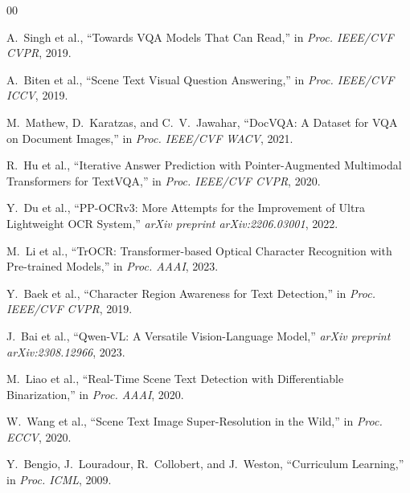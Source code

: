 \documentclass[conference]{IEEEtran}
\begin{document}
\begin{thebibliography}{00}

A.~Singh et al., ``Towards VQA Models That Can Read,'' in \emph{Proc. IEEE/CVF CVPR}, 2019.

A.~Biten et al., ``Scene Text Visual Question Answering,'' in \emph{Proc. IEEE/CVF ICCV}, 2019.

M.~Mathew, D.~Karatzas, and C.~V.~Jawahar, ``DocVQA: A Dataset for VQA on Document Images,'' in \emph{Proc. IEEE/CVF WACV}, 2021.

R.~Hu et al., ``Iterative Answer Prediction with Pointer-Augmented Multimodal Transformers for TextVQA,'' in \emph{Proc. IEEE/CVF CVPR}, 2020.

Y.~Du et al., ``PP-OCRv3: More Attempts for the Improvement of Ultra Lightweight OCR System,'' \emph{arXiv preprint arXiv:2206.03001}, 2022.

M.~Li et al., ``TrOCR: Transformer-based Optical Character Recognition with Pre-trained Models,'' in \emph{Proc. AAAI}, 2023.

Y.~Baek et al., ``Character Region Awareness for Text Detection,'' in \emph{Proc. IEEE/CVF CVPR}, 2019.

J.~Bai et al., ``Qwen-VL: A Versatile Vision-Language Model,'' \emph{arXiv preprint arXiv:2308.12966}, 2023.

M.~Liao et al., ``Real-Time Scene Text Detection with Differentiable Binarization,'' in \emph{Proc. AAAI}, 2020.

W.~Wang et al., ``Scene Text Image Super-Resolution in the Wild,'' in \emph{Proc. ECCV}, 2020.

Y.~Bengio, J.~Louradour, R.~Collobert, and J.~Weston, ``Curriculum Learning,'' in \emph{Proc. ICML}, 2009.

\end{thebibliography}
\end{document}
